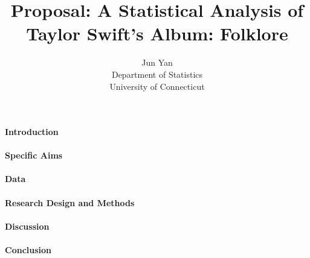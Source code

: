 \documentclass[12pt]{article}
\title{Proposal: A Statistical Analysis of Taylor Swift's Album: Folklore}
\author{Jun Yan\\
  Department of Statistics\\
  University of Connecticut
}
\begin{document}
\maketitle


\paragraph{Introduction}


\paragraph{Specific Aims}


\paragraph{Data}


\paragraph{Research Design and Methods}


\paragraph{Discussion}


\paragraph{Conclusion}





\end{document}
